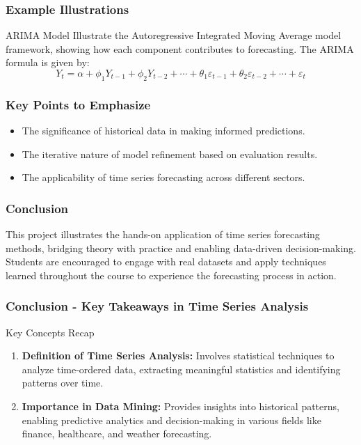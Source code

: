 \documentclass[aspectratio=169]{beamer}
\begin{document}
\begin{frame}[fragile]
    \frametitle{Example Illustrations}
    \begin{block}{ARIMA Model}
        Illustrate the Autoregressive Integrated Moving Average model framework, showing how each component contributes to forecasting. 
        The ARIMA formula is given by:
        \begin{equation}
            Y_t = \alpha + \phi_1 Y_{t-1} + \phi_2 Y_{t-2} + \cdots + \theta_1 \varepsilon_{t-1} + \theta_2 \varepsilon_{t-2} + \cdots + \varepsilon_t
        \end{equation}
    \end{block}
\end{frame}

\begin{frame}[fragile]
    \frametitle{Key Points to Emphasize}
    \begin{itemize}
        \item The significance of historical data in making informed predictions.
        \item The iterative nature of model refinement based on evaluation results.
        \item The applicability of time series forecasting across different sectors.
    \end{itemize}
\end{frame}

\begin{frame}[fragile]
    \frametitle{Conclusion}
    This project illustrates the hands-on application of time series forecasting methods, bridging theory with practice and enabling data-driven decision-making. 
    Students are encouraged to engage with real datasets and apply techniques learned throughout the course to experience the forecasting process in action.
\end{frame}

\begin{frame}[fragile]
    \frametitle{Conclusion - Key Takeaways in Time Series Analysis}
    \begin{block}{Key Concepts Recap}
        \begin{enumerate}
            \item \textbf{Definition of Time Series Analysis:} 
            Involves statistical techniques to analyze time-ordered data, extracting meaningful statistics and identifying patterns over time.
            
            \item \textbf{Importance in Data Mining:} 
            Provides insights into historical patterns, enabling predictive analytics and decision-making in various fields like finance, healthcare, and weather forecasting.
        \end{enumerate}
    \end{block}
\end{frame}
\end{document}
